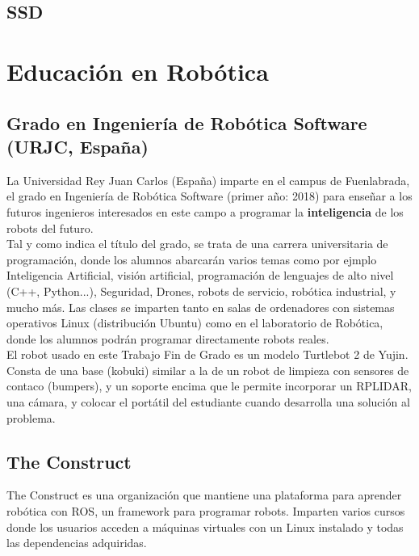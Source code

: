 \subsection{SSD}
\label{subsec:SSD}

\section{Educación en Robótica}
\label{sec:educacion_robotica}

\subsection{Grado en Ingeniería de Robótica Software (URJC, España)}
\label{subsec:grado_robotica_software}
La Universidad Rey Juan Carlos (España) imparte en el campus de Fuenlabrada, el grado en Ingeniería de Robótica Software (primer año: 2018) para enseñar a los futuros ingenieros interesados en este campo a programar la \textbf{inteligencia} de los robots del futuro.\\

Tal y como indica el título del grado, se trata de una carrera universitaria de programación, donde los alumnos abarcarán varios temas como por ejmplo Inteligencia Artificial, visión artificial, programación de lenguajes de alto nivel (C++, Python...), Seguridad, Drones, robots de servicio, robótica industrial, y mucho más. Las clases se imparten tanto en salas de ordenadores con sistemas operativos Linux (distribución Ubuntu) como en el laboratorio de Robótica, donde los alumnos podrán programar directamente robots reales.\\

El robot usado en este Trabajo Fin de Grado es un modelo Turtlebot 2 de Yujin. Consta de una base (kobuki) similar a la de un robot de limpieza con sensores de contaco (bumpers), y un soporte encima que le permite incorporar un RPLIDAR, una cámara, y colocar el portátil del estudiante cuando desarrolla una solución al problema.

\subsection{The Construct}
\label{sec:the_construct}
The Construct es una organización que mantiene una plataforma para aprender robótica con ROS, un framework para programar robots. Imparten varios cursos donde los usuarios acceden a máquinas virtuales con un Linux instalado y todas las dependencias adquiridas. 

